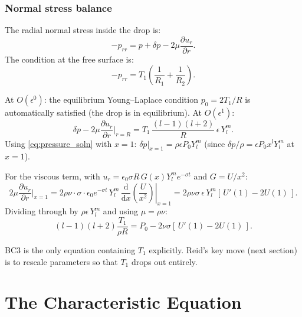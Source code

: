 \documentclass[12pt]{article}
\newcommand{\dd}{\mathrm{d}}
\theoremstyle{definition}
\begin{document}
\subsubsection{Normal stress balance}

The radial normal stress inside the drop is:
\begin{equation}
  -p_{rr} = p + \delta p - 2\mu\frac{\partial u_r}{\partial r}.
  \label{eq:normal_stress}
\end{equation}
The condition at the free surface is:
\begin{equation}
  -p_{rr} = T_1\!\left(\frac{1}{R_1} + \frac{1}{R_2}\right).
  \label{eq:normal_BC}
\end{equation}

\begin{derivbox}[Derivation of BC3]
At $O(\epsilon^0)$: the equilibrium Young--Laplace condition $p_0 = 2T_1/R$
is automatically satisfied (the drop is in equilibrium). At $O(\epsilon^1)$:
\[
  \delta p - 2\mu\frac{\partial u_r}{\partial r}\bigg|_{r=R}
  = T_1\,\frac{(l-1)(l+2)}{R}\,\epsilon\,Y_l^m.
\]
Using \eqref{eq:pressure_soln} with $x = 1$: $\delta p|_{x=1} = \rho\epsilon P_0 Y_l^m$
(since $\delta p/\rho = \epsilon P_0 x^l Y_l^m$ at $x=1$).

For the viscous term, with $u_r = \epsilon_0\sigma R\,G(x)Y_l^m e^{-\sigma t}$
and $G = U/x^2$:
\[
  2\mu\frac{\partial u_r}{\partial r}\bigg|_{x=1}
  = 2\rho\nu\cdot\sigma\cdot\epsilon_0 e^{-\sigma t}\,Y_l^m\,
    \left.\frac{\dd}{\dd x}\!\left(\frac{U}{x^2}\right)\right|_{x=1}
  = 2\rho\nu\sigma\,\epsilon\,Y_l^m\left[\,U'(1) - 2U(1)\,\right].
\]
Dividing through by $\rho\epsilon\,Y_l^m$ and using $\mu = \rho\nu$:
\begin{equation}
  (l-1)(l+2)\frac{T_1}{\rho R} = P_0 - 2\nu\sigma\!\left[\,U'(1) - 2U(1)\,\right].
  \label{eq:BC3}
\end{equation}
\end{derivbox}

\begin{notebox}
BC3 is the only equation containing $T_1$ explicitly. Reid's key move (next section)
is to rescale parameters so that $T_1$ drops out entirely.
\end{notebox}

\section{The Characteristic Equation}
\label{sec:char_eq}
\end{document}
